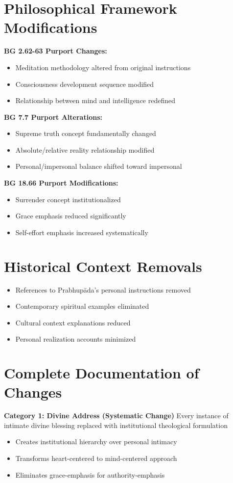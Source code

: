\documentclass[11pt,twoside]{book}
\begin{document}
\section*{Philosophical Framework Modifications}
\label{sec:org1ff4cf3}
\textbf{\textbf{BG 2.62-63 Purport Changes:}}
\begin{itemize}
\item Meditation methodology altered from original instructions
\item Consciousness development sequence modified
\item Relationship between mind and intelligence redefined
\end{itemize}

\textbf{\textbf{BG 7.7 Purport Alterations:}}
\begin{itemize}
\item Supreme truth concept fundamentally changed
\item Absolute/relative reality relationship modified
\item Personal/impersonal balance shifted toward impersonal
\end{itemize}

\textbf{\textbf{BG 18.66 Purport Modifications:}}
\begin{itemize}
\item Surrender concept institutionalized
\item Grace emphasis reduced significantly
\item Self-effort emphasis increased systematically
\end{itemize}
\section*{Historical Context Removals}
\label{sec:org34df124}
\begin{itemize}
\item References to Prabhupāda's personal instructions removed
\item Contemporary spiritual examples eliminated
\item Cultural context explanations reduced
\item Personal realization accounts minimized
\end{itemize}
\section*{Complete Documentation of Changes}
\label{sec:orgaf97594}

\textbf{\textbf{Category 1: Divine Address (Systematic Change)}}
Every instance of intimate divine blessing replaced with institutional theological formulation
\begin{itemize}
\item Creates institutional hierarchy over personal intimacy
\item Transforms heart-centered to mind-centered approach
\item Eliminates grace-emphasis for authority-emphasis
\end{itemize}
\end{document}
